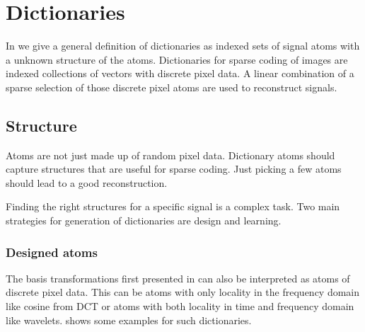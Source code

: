 \chapter{Dictionaries}
In  we give a general definition of dictionaries 
as indexed sets of signal atoms with a unknown structure of the atoms.
Dictionaries for sparse coding of images are indexed collections of vectors with
discrete pixel data. A linear combination of a sparse selection of those
discrete pixel atoms are used to reconstruct signals. 

\section{Structure}
Atoms are not just made up of random pixel data. Dictionary atoms should
capture structures that are useful for sparse coding. Just picking a few atoms
should lead to a good reconstruction. 

Finding the right structures for a specific signal is a complex task.
Two main strategies for generation of dictionaries are design and
learning.

\subsection{Designed atoms}
The basis transformations first presented in  can also
be interpreted as atoms of discrete pixel data. This can be atoms with only
locality in the frequency domain like cosine from DCT or atoms with both
locality in time and frequency domain like wavelets.
 shows some examples for such
dictionaries. 


